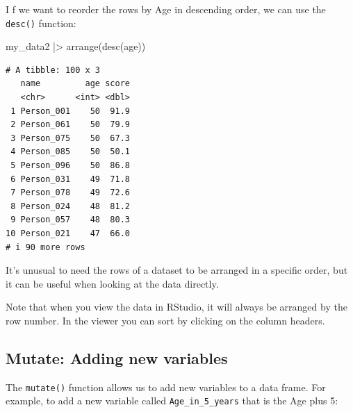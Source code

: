 \documentclass[
  letterpaper,
  8pt,
  a4paper]{book}
\newenvironment{Shaded}{\begin{snugshade}}{\end{snugshade}}
\newcommand{\FunctionTok}[1]{\textcolor[rgb]{0.28,0.35,0.67}{#1}}
\newcommand{\NormalTok}[1]{\textcolor[rgb]{0.00,0.23,0.31}{#1}}
\newcommand{\SpecialCharTok}[1]{\textcolor[rgb]{0.37,0.37,0.37}{#1}}
\begin{document}
I f we want to reorder the rows by Age in descending order, we can use
the \texttt{desc()} function:

\begin{Shaded}
\begin{Highlighting}[]
\NormalTok{my\_data2 }\SpecialCharTok{|\textgreater{}} 
  \FunctionTok{arrange}\NormalTok{(}\FunctionTok{desc}\NormalTok{(age))}
\end{Highlighting}
\end{Shaded}

\begin{verbatim}
# A tibble: 100 x 3
   name         age score
   <chr>      <int> <dbl>
 1 Person_001    50  91.9
 2 Person_061    50  79.9
 3 Person_075    50  67.3
 4 Person_085    50  50.1
 5 Person_096    50  86.8
 6 Person_031    49  71.8
 7 Person_078    49  72.6
 8 Person_024    48  81.2
 9 Person_057    48  80.3
10 Person_021    47  66.0
# i 90 more rows
\end{verbatim}

It's unusual to need the rows of a dataset to be arranged in a specific
order, but it can be useful when looking at the data directly.

\begin{tcolorbox}[enhanced jigsaw, arc=.35mm, bottomrule=.15mm, bottomtitle=1mm, breakable, colback=white, colbacktitle=quarto-callout-tip-color!10!white, colframe=quarto-callout-tip-color-frame, coltitle=black, left=2mm, leftrule=.75mm, opacityback=0, opacitybacktitle=0.6, rightrule=.15mm, title=\textcolor{quarto-callout-tip-color}{\faLightbulb}\hspace{0.5em}{Tip}, titlerule=0mm, toprule=.15mm, toptitle=1mm]

Note that when you view the data in RStudio, it will always be arranged
by the row number. In the viewer you can sort by clicking on the column
headers.

\end{tcolorbox}

\subsection*{Mutate: Adding new
variables}\label{mutate-adding-new-variables}

The \texttt{mutate()} function allows us to add new variables to a data
frame. For example, to add a new variable called
\texttt{Age\_in\_5\_years} that is the Age plus 5:
\end{document}

